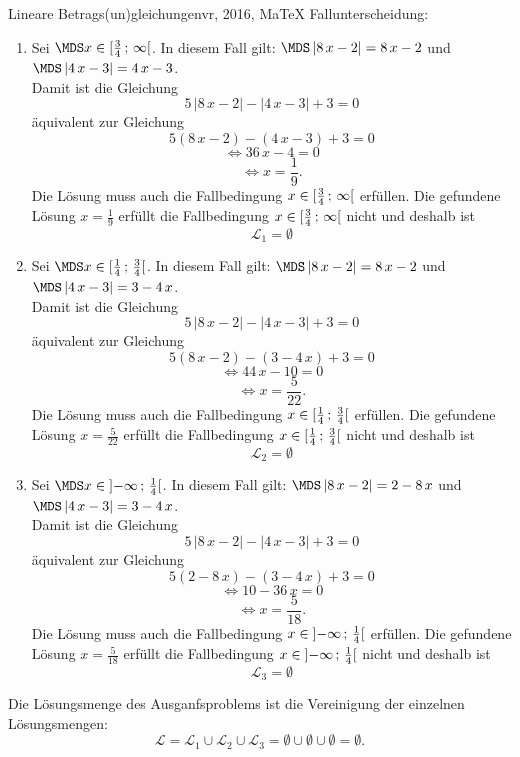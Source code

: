 \begin{MAufgabe}{Lineare Betrags(un)gleichungen}{vr, 2016, MaTeX}
 Fallunterscheidung: 

 \begin{enumerate} 
 \item Sei $ \MDS x\in[ \frac{3}{4} \, \MIntvlSep \, \infty\MoIr $. 
 In diesem Fall gilt: 
  $ \MDS \left| 8\, x - 2\right|=8\, x - 2$ und $ \MDS \left| 4\, x - 3\right|=4\, x - 3$. \\ 
 Damit ist die Gleichung 
 $$ 
5\, \left|8\, x - 2\right| - \left|4\, x - 3\right| + 3= 0
$$
 \"aquivalent zur Gleichung
 $$ 
5\left(8\, x - 2\right)-\left( 4\, x - 3\right)+3= 0 
$$  
$$ 
 \Leftrightarrow 36\, x - 4= 0 
$$  
$$ \Leftrightarrow x = \frac{1}{9} . 
 $$ 
 Die L\"osung muss auch die Fallbedingung $x\in [ \frac{3}{4} \, ; \, \infty[\mbox{}  $ erf\"ullen. Die gefundene L\"osung $x=\frac{1}{9}$ erf\"ullt die Fallbedingung  $x\in [ \frac{3}{4} \, ; \, \infty[\mbox{} $ nicht und deshalb ist  $$
 \mathcal{L}_{1}=\emptyset 
 $$ 
\item Sei $ \MDS x\in[ \frac{1}{4} \, \MIntvlSep \, \frac{3}{4}\MoIr $. 
 In diesem Fall gilt: 
  $ \MDS \left| 8\, x - 2\right|=8\, x - 2$ und $ \MDS \left| 4\, x - 3\right|=3 - 4\, x$. \\ 
 Damit ist die Gleichung 
 $$ 
5\, \left|8\, x - 2\right| - \left|4\, x - 3\right| + 3= 0
$$
 \"aquivalent zur Gleichung
 $$ 
5\left(8\, x - 2\right)-\left( 3 - 4\, x\right)+3= 0 
$$  
$$ 
 \Leftrightarrow 44\, x - 10= 0 
$$  
$$ \Leftrightarrow x = \frac{5}{22} . 
 $$ 
 Die L\"osung muss auch die Fallbedingung $x\in [ \frac{1}{4} \, ; \, \frac{3}{4}[\mbox{}  $ erf\"ullen. Die gefundene L\"osung $x=\frac{5}{22}$ erf\"ullt die Fallbedingung  $x\in [ \frac{1}{4} \, ; \, \frac{3}{4}[\mbox{} $ nicht und deshalb ist  $$
 \mathcal{L}_{2}=\emptyset 
 $$ 
\item Sei $ \MDS x\in\MoIl  -\infty \, \MIntvlSep \, \frac{1}{4}\MoIr $. 
 In diesem Fall gilt: 
  $ \MDS \left| 8\, x - 2\right|=2 - 8\, x$ und $ \MDS \left| 4\, x - 3\right|=3 - 4\, x$. \\ 
 Damit ist die Gleichung 
 $$ 
5\, \left|8\, x - 2\right| - \left|4\, x - 3\right| + 3= 0
$$
 \"aquivalent zur Gleichung
 $$ 
5\left(2 - 8\, x\right)-\left( 3 - 4\, x\right)+3= 0 
$$  
$$ 
 \Leftrightarrow 10 - 36\, x= 0 
$$  
$$ \Leftrightarrow x = \frac{5}{18} . 
 $$ 
 Die L\"osung muss auch die Fallbedingung $x\in \mbox{}]\mathopen{}  -\infty \, ; \, \frac{1}{4}[\mbox{}  $ erf\"ullen. Die gefundene L\"osung $x=\frac{5}{18}$ erf\"ullt die Fallbedingung  $x\in \mbox{}]\mathopen{}  -\infty \, ; \, \frac{1}{4}[\mbox{} $ nicht und deshalb ist  $$
 \mathcal{L}_{3}=\emptyset 
 $$ 
 \end{enumerate} 
  Die L\"osungsmenge des Ausganfsproblems ist die Vereinigung der einzelnen L\"osungsmengen: 
$$ \mathcal{L} = \mathcal{L}_{1} \cup \mathcal{L}_{2} \cup \mathcal{L}_{3} 
 = \emptyset\cup \emptyset\cup \emptyset 
   =\emptyset 
   . $$ 
 

\end{MAufgabe}
